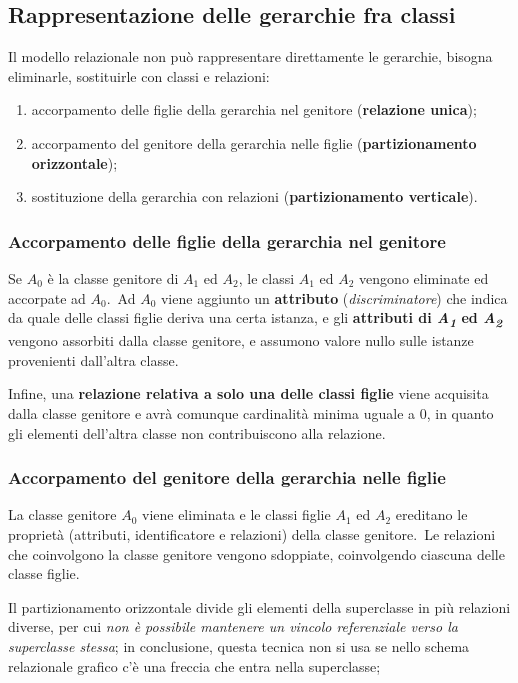 \subsection{Rappresentazione delle gerarchie fra classi}

Il modello relazionale non può rappresentare direttamente le gerarchie, bisogna eliminarle, sostituirle con classi e
relazioni:
\begin{enumerate}
	\item accorpamento delle figlie della gerarchia nel genitore (\textbf{relazione unica});
	\item accorpamento del genitore della gerarchia nelle figlie (\textbf{partizionamen\-to orizzontale});
	\item sostituzione della gerarchia con relazioni (\textbf{partizionamento verticale}).
\end{enumerate}

\subsubsection{Accorpamento delle figlie della gerarchia nel genitore}

Se $A_{0}$ è la classe genitore di $A_{1}$ ed $A_{2}$, le classi $A_{1}$ ed $A_{2}$ vengono eliminate ed accorpate ad $A_{0}$.\
Ad $A_{0}$ viene aggiunto un \textbf{attributo} (\textit{discriminatore}) che indica da quale delle classi figlie deriva una certa istanza, e gli \textbf{attributi di \textit{A\textsubscript{1}} ed \textit{A\textsubscript{2}}} vengono assorbiti dalla classe genitore, e assumono valore nullo sulle istanze provenienti dall'altra classe.

Infine, una \textbf{relazione relativa a solo una delle classi figlie} viene acquisita dalla classe genitore e avrà comunque cardinalità minima uguale a 0, in quanto gli elementi dell'altra classe non contribuiscono alla relazione.

\subsubsection{Accorpamento del genitore della gerarchia nelle figlie }

La classe genitore $A_{0}$ viene eliminata e le classi figlie $A_{1}$ ed $A_{2}$ ereditano le proprietà (attributi, identificatore e relazioni) della classe genitore.\
Le relazioni che coinvolgono la classe genitore vengono sdoppiate, coinvolgendo ciascuna delle classe figlie.\

Il partizionamento orizzontale divide gli elementi della superclasse in più relazioni diverse, per cui \textit{non è possibile mantenere un vincolo referenziale verso la superclasse stessa}; in conclusione, questa tecnica non si usa se nello schema relazionale grafico c'è una freccia che entra nella superclasse;

